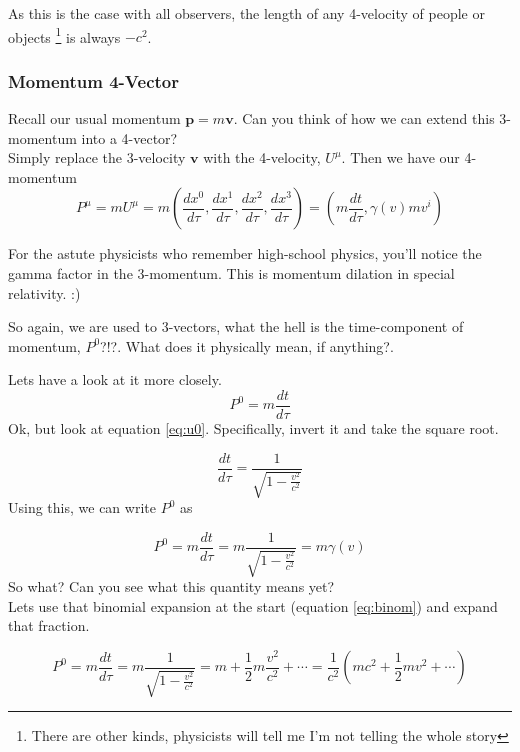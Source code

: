 As this is the case with all observers, the length of any 4-velocity of people or objects \footnote{There are other kinds, physicists will tell me I'm not telling the whole story} is always $-c^2$. 


\subsubsection{Momentum 4-Vector}
Recall our usual momentum $\mathbf{p} = m \mathbf{v}$. Can you think of how we can extend this 3-momentum into a 4-vector? \\

Simply replace the 3-velocity $\mathbf{v}$ with the 4-velocity, $U^\mu$. Then we have our 4-momentum
\begin{equation}
  P^\mu = m U^\mu = m (\frac{dx^0}{d\tau}, \frac{dx^1}{d\tau},\frac{dx^2}{d\tau},\frac{dx^3}{d\tau}) = (m \frac{dt}{d\tau},\gamma(v) m  v^i)
\end{equation}

For the astute physicists who remember high-school physics, you'll notice the gamma factor in the 3-momentum. This is momentum dilation in special relativity. :)

So again, we are used to 3-vectors, what the hell is the time-component of momentum, $P^0$?!?. What does it physically mean, if anything?. 

Lets have a look at it more closely.
\begin{equation}
  P^0 = m \frac{dt}{d\tau}
\end{equation}
Ok, but look at equation \eqref{eq:u0}. Specifically, invert it and take the square root. 

\begin{equation}
  \frac{dt}{d\tau} = \frac{1}{\sqrt{1  - \frac{v^2}{c^2}}}
\end{equation}
Using this, we can write $P^0$ as

\begin{equation}
  P^0 = m \frac{dt}{d\tau} = m \frac{1}{\sqrt{1 - \frac{v^2}{c^2}}}  = m\gamma(v)
\end{equation}
So what? Can you see what this quantity means yet? \\
Lets use that binomial expansion at the start (equation \eqref{eq:binom}) and expand that fraction. 

\begin{equation}
  P^0 = m \frac{dt}{d\tau} = m \frac{1}{\sqrt{1 - \frac{v^2}{c^2}}} = m + \frac{1}{2} m \frac{v^2}{c^2} + \cdots = \frac{1}{c^2} (m c^2 + \frac{1}{2}m v^2 + \cdots)
\end{equation}

